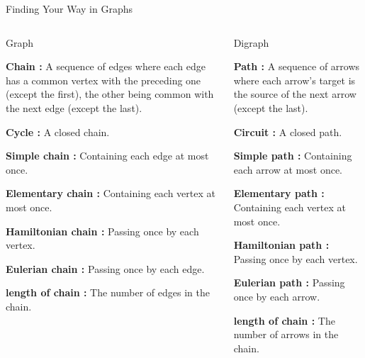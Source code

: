 \documentclass[32pt,aspectratio=169]{beamer}
\begin{document}
\begin{frame}{Finding Your Way in Graphs}
  \begin{columns}
    \begin{column}{.55\textwidth}
      \begin{halfshyblock}{Graph}
        {\small
        \textbf{Chain :} A sequence of edges where each edge has a
        common vertex with the preceding one (except the first), the
        other being common with the next edge (except the last).

        \textbf{Cycle :} A closed chain.

        \textbf{Simple chain :} Containing each edge at most once.

        \textbf{Elementary chain :} Containing each vertex at most
        once.

        \textbf{Hamiltonian chain :} Passing once by each vertex.

        \textbf{Eulerian chain :} Passing once by each edge.

        \textbf{length of chain :} The number of edges in the chain.
      }
      \end{halfshyblock}
    \end{column}
    \begin{column}{.55\textwidth}
      \begin{halfshyblock}{Digraph}
        {\small \textbf{Path :} A sequence of arrows where each
          arrow's target is the source of the next arrow (except the
          last).

          \vspace{\baselineskip}

        \textbf{Circuit :} A closed path.

        \textbf{Simple path :} Containing each arrow at most once.

        \textbf{Elementary path :} Containing each vertex at most
        once.

        \textbf{Hamiltonian path :} Passing once by each vertex.

        \textbf{Eulerian path :} Passing once by each arrow.

        \textbf{length of chain :} The number of arrows in the chain.
      }
      \end{halfshyblock}
    \end{column}
  \end{columns}
\end{frame}
\end{document}
